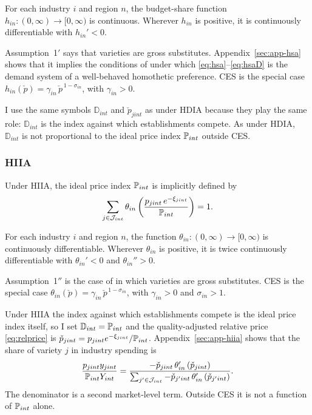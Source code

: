 \begin{assumhsa}
For each industry $i$ and region $n$, the budget-share function $h_{in}: (0,\infty) \to [0,\infty)$ is continuous.
Wherever $h_{in}$ is positive, it is continuously differentiable with $h_{in}' < 0$.
\end{assumhsa}

Assumption~1$'$ says that varieties are gross substitutes.
Appendix~\ref{sec:app-hsa} shows that it implies the conditions of \textcite{Matsuyama&Ushev17} under which \eqref{eq:hsa}--\eqref{eq:hsaD} is the demand system of a well-behaved homothetic preference.
CES is the special case $h_{in}(\check{p}) = \gamma_{in}\, \check{p}^{\,1-\sigma_{in}}$, with $\gamma_{in} > 0$.

I use the same symbols $\mathbb{D}_{int}$ and $\check{p}_{jint}$ as under HDIA because they play the same role: $\mathbb{D}_{int}$ is the index against which establishments compete.
As under HDIA, $\mathbb{D}_{int}$ is not proportional to the ideal price index $\P_{int}$ outside CES.

\subsubsection{HIIA}\label{sec:hiia}

Under HIIA, the ideal price index $\P_{int}$ is implicitly defined by
\begin{equation}\label{eq:hiia}
	\sum_{j \in \cJ_{int}} \theta_{in}\left(\frac{p_{jint} \, e^{-\xi_{jint}}}{\P_{int}}\right) = 1.
\end{equation}

\begin{assumhiia}
For each industry $i$ and region $n$, the function $\theta_{in}: (0,\infty) \to [0,\infty)$ is continuously differentiable.
Wherever $\theta_{in}$ is positive, it is twice continuously differentiable with $\theta_{in}' < 0$ and $\theta_{in}'' > 0$.
\end{assumhiia}

Assumption~1$''$ is the case of \textcite{Matsuyama&Ushev17} in which varieties are gross substitutes.
CES is the special case $\theta_{in}(\check{p}) = \gamma_{in}\, \check{p}^{\,1-\sigma_{in}}$, with $\gamma_{in} > 0$ and $\sigma_{in} > 1$.

Under HIIA the index against which establishments compete is the ideal price index itself, so I set $\mathbb{D}_{int} = \P_{int}$ and the quality-adjusted relative price \eqref{eq:relprice} is $\check{p}_{jint} = p_{jint} e^{-\xi_{jint}}/\P_{int}$.
Appendix~\ref{sec:app-hiia} shows that the share of variety $j$ in industry spending is
\begin{equation}\label{eq:hiiashare}
	\frac{p_{jint} y_{jint}}{\P_{int} Y_{int}} = \frac{-\check{p}_{jint} \, \theta_{in}'\left(\check{p}_{jint}\right)}{\sum_{j' \in \cJ_{int}} -\check{p}_{j'int} \, \theta_{in}'\left(\check{p}_{j'int}\right)}.
\end{equation}
The denominator is a second market-level term.
Outside CES it is not a function of $\P_{int}$ alone.

